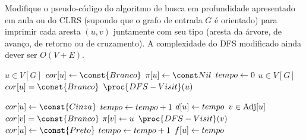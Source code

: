 Modifique o pseudo-código do algoritmo de busca em profundidade apresentado em aula ou do CLRS (supondo que o grafo de entrada $G$ é orientado) para imprimir cada aresta $(u, v)$ juntamente com seu tipo (aresta da árvore, de avanço, de retorno ou de cruzamento). A complexidade do DFS modificado ainda dever ser $O(V + E)$.

\itemdsep

\newcommand{\Branco}{\const{Branco}\xspace}
\newcommand{\Cinza}{\const{Cinza}\xspace}
\newcommand{\Preto}{\const{Preto}\xspace}

\begin{codebox}
\li \Para \Cada $u \in V[G]$ \Faca
    \Do
\li     $cor[u] \Recebe \Branco$
\li     $\pi[u] \Recebe \Nulo$
    \End
\li $tempo \leftarrow 0$
\li \Para \Cada $u \in V[G]$ \Faca
    \Do
\li     \Se $cor[u] = \Branco$
        \Do
\li         \Entao $\proc{DFS-Visit}(u)$
        \End
    \End
\end{codebox}

\begin{codebox}
\li $cor[u] \Recebe \Cinza$
\li $tempo \leftarrow tempo + 1$
\li $d[u] \leftarrow tempo$
\li \Para \Cada $v \in \operatorname{Adj}[u]$
    \Do
\li     \Se $cor[v] = \Branco$ \Entao
        \Do
\li         \Entao
            \Do
\li             $\pi[v] \leftarrow u$
\li             $\proc{DFS-Visit}(v)$
            \End
        \End
    \End
\li $cor[u] \Recebe \Preto$
\li $tempo \leftarrow tempo + 1$
\li $f[u] \leftarrow tempo$
\end{codebox}
